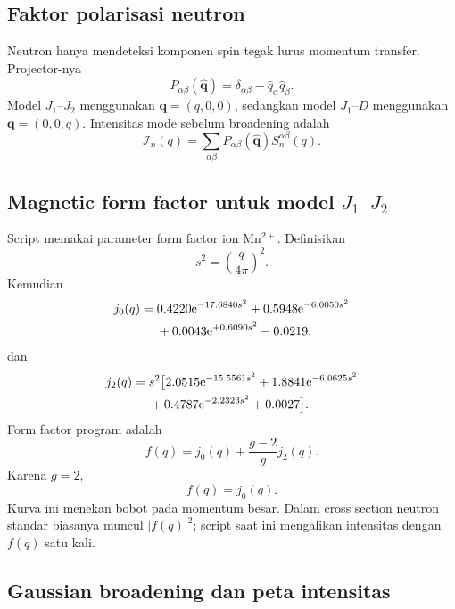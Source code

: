 \documentclass[11pt,a4paper]{article}
\newcommand{\ee}{\mathrm{e}}
\newcommand{\vq}{\bm q}
\begin{document}
\subsection{Faktor polarisasi neutron}

Neutron hanya mendeteksi komponen spin tegak lurus momentum transfer. Projector-nya
\begin{equation}
P_{\alpha\beta}(\widehat{\vq})
=\delta_{\alpha\beta}
-\widehat q_\alpha\widehat q_\beta.
\label{eq:polarization}
\end{equation}
Model $J_1$--$J_2$ menggunakan $\vq=(q,0,0)$, sedangkan model $J_1$--$D$ menggunakan $\vq=(0,0,q)$. Intensitas mode sebelum broadening adalah
\begin{equation}
\mathcal I_n(q)
=\sum_{\alpha\beta}
P_{\alpha\beta}(\widehat{\vq})
S_n^{\alpha\beta}(q).
\end{equation}

\subsection{Magnetic form factor untuk model \texorpdfstring{$J_1$--$J_2$}{J1--J2}}

Script memakai parameter form factor ion Mn$^{2+}$. Definisikan
\begin{equation}
s^2=\left(\frac{q}{4\pi}\right)^2.
\end{equation}
Kemudian
\begin{align}
j_0(q)={}&
0.4220\ee^{-17.6840s^2}
+0.5948\ee^{-6.0050s^2}\notag\\
&+0.0043\ee^{+0.6090s^2}-0.0219,
\end{align}
dan
\begin{align}
j_2(q)={}&s^2\big[
2.0515\ee^{-15.5561s^2}
+1.8841\ee^{-6.0625s^2}\notag\\
&+0.4787\ee^{-2.2323s^2}
+0.0027\big].
\end{align}
Form factor program adalah
\begin{equation}
f(q)=j_0(q)+\frac{g-2}{g}j_2(q).
\end{equation}
Karena $g=2$,
\begin{equation}
f(q)=j_0(q).
\end{equation}
Kurva ini menekan bobot pada momentum besar. Dalam cross section neutron standar biasanya muncul $|f(q)|^2$; script saat ini mengalikan intensitas dengan $f(q)$ satu kali.

\subsection{Gaussian broadening dan peta intensitas}
\end{document}
